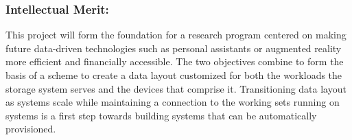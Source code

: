 \subsubsection*{Intellectual Merit: }


This project will form the foundation for a research program centered on making
future data-driven technologies such as personal assistants or augmented reality
more efficient and financially accessible.  The two objectives combine to form
the basis of a scheme to create a data layout customized for both the workloads
the storage system serves and the devices that comprise it.  Transitioning
data layout as systems scale while maintaining a connection to the working sets
running on systems is a first step towards building systems that can be
automatically provisioned.
%


%


